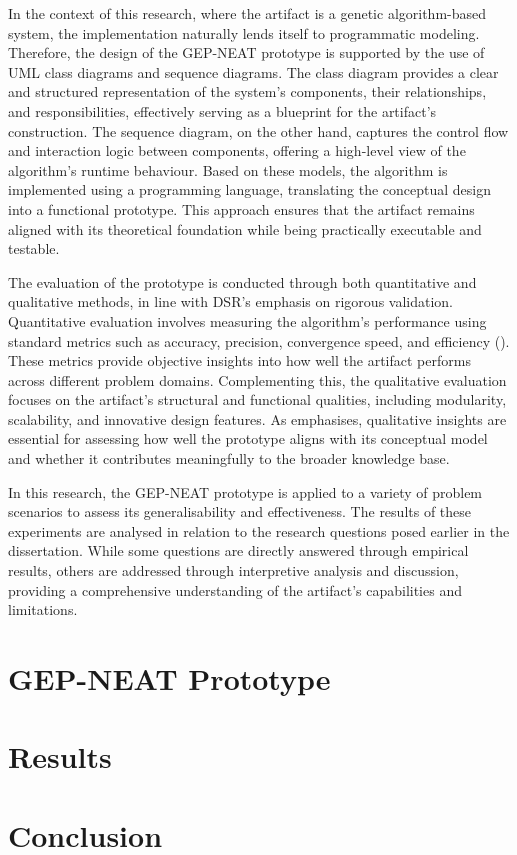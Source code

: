 \parbreak\noindent In the context of this research, where the artifact is a genetic algorithm-based system, the implementation naturally lends itself to programmatic modeling. Therefore, the design of the GEP-NEAT prototype is supported by the use of UML class diagrams and sequence diagrams. The class diagram provides a clear and structured representation of the system's components, their relationships, and responsibilities, effectively serving as a blueprint for the artifact's construction. The sequence diagram, on the other hand, captures the control flow and interaction logic between components, offering a high-level view of the algorithm's runtime behaviour. Based on these models, the algorithm is implemented using a programming language, translating the conceptual design into a functional prototype. This approach ensures that the artifact remains aligned with its theoretical foundation while being practically executable and testable.

\parbreak\noindent The evaluation of the prototype is conducted through both quantitative and qualitative methods, in line with DSR's emphasis on rigorous validation. Quantitative evaluation involves measuring the algorithm's performance using standard metrics such as accuracy, precision, convergence speed, and efficiency (\cite{gregar2023research}). These metrics provide objective insights into how well the artifact performs across different problem domains. Complementing this, the qualitative evaluation focuses on the artifact's structural and functional qualities, including modularity, scalability, and innovative design features. As \cite{olivier2009information} emphasises, qualitative insights are essential for assessing how well the prototype aligns with its conceptual model and whether it contributes meaningfully to the broader knowledge base.

\parbreak\noindent In this research, the GEP-NEAT prototype is applied to a variety of problem scenarios to assess its generalisability and effectiveness. The results of these experiments are analysed in relation to the research questions posed earlier in the dissertation. While some questions are directly answered through empirical results, others are addressed through interpretive analysis and discussion, providing a comprehensive understanding of the artifact's capabilities and limitations.

\section{GEP-NEAT Prototype}\label{sec:proto_proto}

\section{Results}\label{sec:proto_results}

\section{Conclusion}\label{sec:proto_conclusion}
